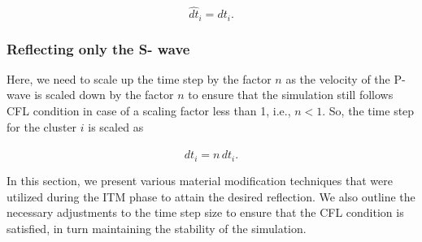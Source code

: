 \begin{equation}
    \hat{dt}_i = dt_i .
\end{equation}

\subsubsection{Reflecting only the S- wave}
Here, we need to scale up the time step by the factor $n$ as the velocity of the P- wave is scaled down by the factor $n$ to ensure that the simulation still follows
\ac{CFL} condition in case of a scaling factor less than 1, i.e., $n < 1$. So, the time step for the cluster $i$ is scaled as

\begin{equation}
    \hat{dt}_i = n \, dt_i .
\end{equation}

In this section, we present various material modification techniques that were utilized during the \ac{ITM} phase to attain the desired reflection. We also outline
the necessary adjustments to the time step size to ensure that the \ac{CFL} condition is satisfied, in turn maintaining the stability of the simulation. \\